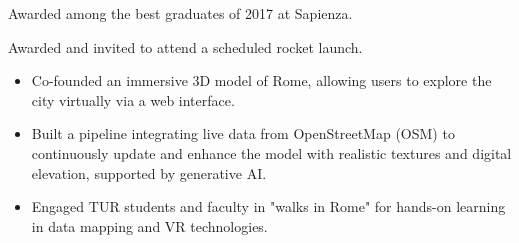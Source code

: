 
	\bigskip

	\begin{paracol}{2}


		Awarded among the best graduates of 2017 at Sapienza.

		\bigskip

		Awarded and invited to attend a scheduled rocket launch.

		\switchcolumn


		
		\bigskip


	\end{paracol}
\else

	\begin{itemize}
		\item Co-founded an immersive 3D model of Rome, allowing users to explore the city virtually via a web interface.
		\item Built a pipeline integrating live data from OpenStreetMap (OSM) to continuously update and enhance the model with realistic textures and digital elevation, supported by generative AI.
		\item Engaged TUR students and faculty in "walks in Rome" for hands-on learning in data mapping and VR technologies.
	\end{itemize}
	\smallskip	
\fi

\bigskip


\iflongversion

